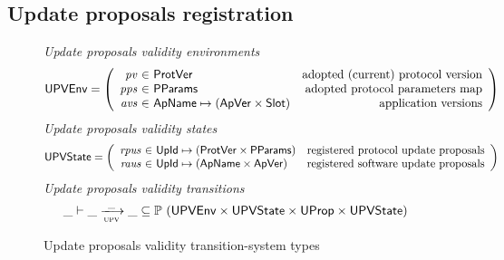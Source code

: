 \subsection{Update proposals registration}
\label{sec:update-proposals-registration}

\begin{figure}[htb]
  \emph{Update proposals validity environments}
  \begin{equation*}
    \UPVEnv =
    \left(
      \begin{array}{r@{~\in~}lr}
        \var{pv} & \ProtVer & \text{adopted (current) protocol version}\\
        \var{pps} & \PPMMap & \text{adopted protocol parameters map}\\
        \var{avs} & \ApName \mapsto (\ApVer \times \Slot)
        & \text{application versions}\\
      \end{array}
    \right)
  \end{equation*}
  \emph{Update proposals validity states}
  \begin{equation*}
    \UPVState
    = \left(
      \begin{array}{r@{~\in~}lr}
        \var{rpus} & \UPropId \mapsto (\ProtVer \times \PPMMap)
        & \text{registered protocol update proposals}\\
        \var{raus} & \UPropId \mapsto (\ApName \times \ApVer)
        & \text{registered software update proposals}\\
      \end{array}
    \right)
  \end{equation*}
  \emph{Update proposals validity transitions}
    \begin{equation*}
    \var{\_} \vdash
    \var{\_} \trans{upv}{\_} \var{\_}
    \subseteq \powerset (\UPVEnv \times \UPVState \times \UProp \times \UPVState)
  \end{equation*}
  \caption{Update proposals validity transition-system types}
  \label{fig:ts-types:up-validity}
\end{figure}

